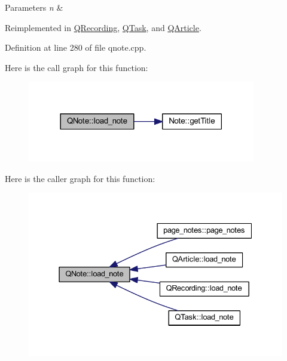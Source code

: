 \begin{DoxyParams}{Parameters}
{\em n} & \\
\hline
\end{DoxyParams}


Reimplemented in \hyperlink{class_q_recording_aa6984351b5a0bceaa63be793b160c73b}{Q\+Recording}, \hyperlink{class_q_task_a548fc51beaa1dcea345c362782aa11c0}{Q\+Task}, and \hyperlink{class_q_article_aea21c10581abe74709317283739e9552}{Q\+Article}.



Definition at line 280 of file qnote.\+cpp.

Here is the call graph for this function\+:\nopagebreak
\begin{figure}[H]
\begin{center}
\leavevmode
\includegraphics[width=282pt]{class_q_note_adca0a8f2851fbb1c3843ca4fe7957c11_cgraph}
\end{center}
\end{figure}
Here is the caller graph for this function\+:\nopagebreak
\begin{figure}[H]
\begin{center}
\leavevmode
\includegraphics[width=331pt]{class_q_note_adca0a8f2851fbb1c3843ca4fe7957c11_icgraph}
\end{center}
\end{figure}
\mbox{\label{class_q_note_ae6fb14b839acc1979b145a892d6a0a92}} 
